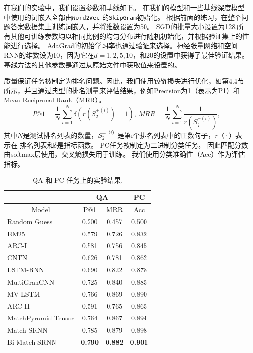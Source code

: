 在我们的实验中，我们设置参数和基线如下。
在我们的模型和一些基线深度模型中使用的词嵌入全部由\texttt {Word2Vec} 的\texttt {SkipGram}初始化。
根据前面的练习，在整个问题答案数据集上训练词嵌入，并将维数设置为50。
SGD的批量大小设置为128.所有其他可训练参数均以相同比例的均匀分布进行随机初始化，并根据验证集上的性能进行选择。 AdaGrad的初始学习率也通过验证来选择。神经张量网络和空间RNN的维数设为10，因为它在$ d = 1,2,5,10，$和$ 20 $的设置中获得了最佳验证结果。基线方法的其他参数是通过从原始文件中获取值来设置的。

质量保证任务被制定为排名问题。因此，我们使用铰链损失进行优化，如第4.4节所示，并且通过典型的排名测量来评估结果，例如Precision为1（表示为P1）和Mean Reciprocal Rank（MRR）。
\begin{equation*}
P@1=\frac{1}{N}\sum_{i=1}^{N}\delta(r(S_2^{+(i)})= 1),\,
MRR=\frac{1}{N}\sum_{i=1}^{N}\frac{1}{r({S_{2}^{+(i)}})},
\end{equation*}
其中$ N $是测试排名列表的数量，$ S_2 ^ {+（i）} $是第i个排名列表中的正数句子，$ r（\cdot）$表示在 排名列表和$ \delta $是指标函数。
PC任务被制定为二进制分类任务。 因此匹配分数由softmax层使用，交叉熵损失用于训练。
我们使用分类准确性（Acc）作为评估指标。

\begin{table}[t]
\begin{tabular}{l|cc|c} \hline
&
\multicolumn{2}{c|}{QA} &
\multicolumn{1}{c}{PC} \\ \hline
\multicolumn{1}{c|}{Model} &
\multicolumn{1}{c}{P@1} &
\multicolumn{1}{c|}{MRR} &
\multicolumn{1}{c}{Acc} \\ \hline
Random Guess			& 0.200 & 0.457 & 0.500   \\
BM25        			& 0.579 & 0.726 & 0.832	    \\ \hline
ARC-I 					& 0.581 & 0.756 	& 0.845	\\
CNTN					& 0.626 & 0.781 	& 0.862 	\\
LSTM-RNN   		  		& 0.690 	& 0.822 	& 0.878 	\\ \hline
MultiGranCNN			& 0.725 	& 0.840 & 0.885		\\
MV-LSTM  				& 0.766	& 0.869	& 0.890	\\ \hline
ARC-II 					& 0.591 & 0.765 	& 0.865	\\
MatchPyramid-Tensor			& 0.764 & 0.867 	& 0.894\\ \hline
Match-SRNN 				& 0.785 & 0.879 & 0.898 \\
Bi-Match-SRNN  			& \textbf{0.790}	& \textbf{0.882} 	& \textbf{0.901}	\\
\hline
\end{tabular}
\centering
\caption{QA 和 PC 任务上的实验结果.}\label{tab:results}
\end{table}

